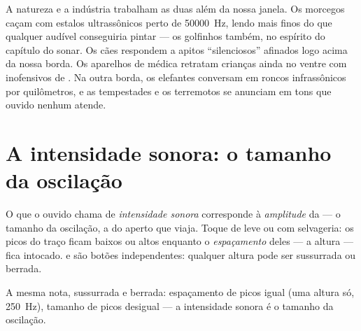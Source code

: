 \begin{example}\label{ex:g8:sound-pitch-loudness:beyond}
A natureza e a indústria trabalham as duas além da nossa janela. Os
morcegos caçam com estalos ultrassônicos perto de \qty{50000}{Hz},
lendo  mais finos do que qualquer  audível conseguiria pintar
--- os golfinhos também, no espírito do capítulo do sonar. Os cães
respondem a apitos ``silenciosos'' afinados logo acima da nossa
borda. Os aparelhos de  médica retratam crianças ainda no
ventre com  inofensivos de . Na outra borda, os
elefantes conversam em roncos infrassônicos por quilômetros, e as
tempestades e os terremotos se anunciam em tons que ouvido nenhum
atende.
\end{example}

\section{A intensidade sonora: o tamanho da oscilação}

\begin{proposition}\label{prop:g8:sound-pitch-loudness:loudness}
O que o ouvido chama de \emph{intensidade sonora} corresponde à
\emph{amplitude} da  --- o tamanho da
oscilação, a  do aperto que viaja. Toque de leve ou com
selvageria: os picos do traço ficam baixos ou altos enquanto o
\emph{espaçamento} deles --- a altura --- fica intocado.  e
 são botões independentes: qualquer altura pode ser
sussurrada ou berrada.
\end{proposition}

\begin{omfigure}

{\small A mesma nota, sussurrada e berrada: espaçamento de picos
igual (uma altura só, \qty{250}{Hz}), tamanho de picos desigual --- a
intensidade sonora é o tamanho da oscilação.}
\end{omfigure}

